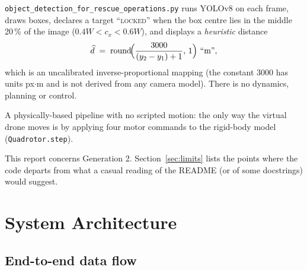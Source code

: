 \documentclass[11pt,a4paper]{article}
\newcommand{\code}[1]{\texttt{\small #1}}
\newcommand{\hatv}[1]{\widehat{#1}}
\begin{document}
\begin{description}[leftmargin=0.5cm,style=nextline]
\item[Generation 1 (legacy; what the README describes).] \code{object\_detection\_for\_rescue\_operations.py}
runs YOLOv8 on each frame, draws boxes, declares a target ``\textsc{locked}'' when the box centre lies in the middle 20\,\% of the
image ($0.4W<c_x<0.6W$), and displays a \emph{heuristic} distance
\begin{equation}
\hatv{d}\;=\;\operatorname{round}\!\Bigl(\frac{3000}{(y_2-y_1)+1},\,1\Bigr)\ \text{``m''},
\label{eq:legacy-dist}
\end{equation}
which is an uncalibrated inverse-proportional mapping (the constant $3000$ has units px$\cdot$m and is not derived from any
camera model). There is no dynamics, planning or control.
\item[Generation 2 (current; \code{dronesim/}).] A physically-based pipeline with no scripted motion: the only way
the virtual drone moves is by applying four motor commands to the rigid-body model (\code{Quadrotor.step}).
\end{description}

This report concerns Generation 2. Section~\ref{sec:limits} lists the points where the code departs from what a casual reading of
the README (or of some docstrings) would suggest.

\section{System Architecture}
\subsection{End-to-end data flow}
\end{document}
